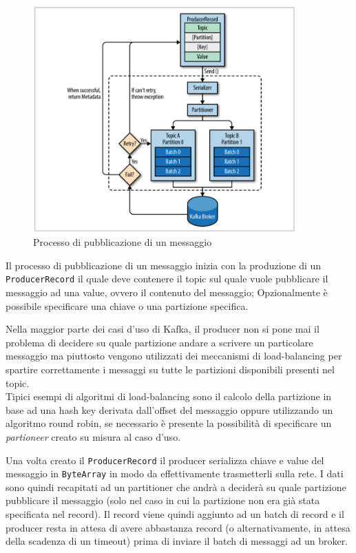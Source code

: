 \documentclass[]{article}
\begin{document}
\begin{figure}
\centering
\includegraphics[width=0.90000\textwidth]{../images/producer-process.png}
\caption{Processo di pubblicazione di un messaggio \label{figure_3}}
\end{figure}

Il processo di pubblicazione di un messaggio inizia con la produzione di
un \texttt{ProducerRecord} il quale deve contenere il topic sul quale
vuole pubblicare il messaggio ad una value, ovvero il contenuto del
messaggio; Opzionalmente è possibile specificare una chiave o una
partizione specifica.

Nella maggior parte dei casi d'uso di Kafka, il producer non si pone mai
il problema di decidere su quale partizione andare a scrivere un
particolare messaggio ma piuttosto vengono utilizzati dei meccanismi di
load-balancing per spartire correttamente i messaggi su tutte le
partizioni disponibili presenti nel topic.\\
Tipici esempi di algoritmi di load-balancing sono il calcolo della
partizione in base ad una hash key derivata dall'offset del messaggio
oppure utilizzando un algoritmo round robin, se necessario è presente la
possibilità di specificare un \emph{partioneer} creato su misura al caso
d'uso.

Una volta creato il \texttt{ProducerRecord} il producer serializza
chiave e value del messaggio in \texttt{ByteArray} in modo da
effettivamente trasmetterli sulla rete. I dati sono quindi recapitati ad
un partitioner che andrà a deciderà su quale partizione pubblicare il
messaggio (solo nel caso in cui la partizione non era già stata
specificata nel record). Il record viene quindi aggiunto ad un batch di
record e il producer resta in attesa di avere abbastanza record (o
alternativamente, in attesa della scadenza di un timeout) prima di
inviare il batch di messaggi ad un broker.
\end{document}
